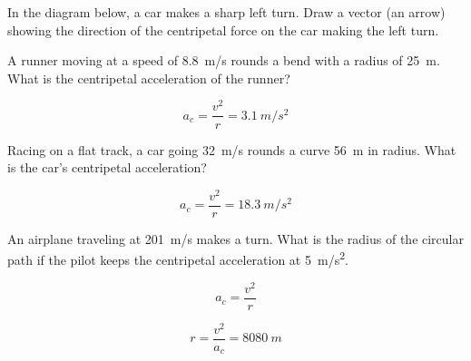 \documentclass[../main-physics-problems.tex]{subfiles}
\begin{document}
\begin{questions}

\question
In the diagram below, a car makes a sharp left turn. Draw a vector (an arrow) showing the direction of the centripetal force on the car making the left turn.

\begin{center}
\end{center}

\question 
A runner moving at a speed of \SI{8.8}{m/s} rounds a bend with a radius of \SI{25}{m}. What is the centripetal acceleration of the runner?

\begin{solution}
\begin{equation*}
    a_c = \frac{v^2}{r} = \SI{3.1}{m/s^2}
\end{equation*}
\end{solution}

\question
Racing on a flat track, a car going \SI{32}{m/s} rounds a curve \SI{56}{m} in radius. What is the car's centripetal acceleration?

\begin{solution}
\begin{equation*}
    a_c = \frac{v^2}{r} = \SI{18.3}{m/s^2}
\end{equation*}
\end{solution}

\question
An airplane traveling at \SI{201}{m/s} makes a turn. What is the radius of the circular path if the pilot keeps the centripetal acceleration at \SI{5}{m/s^2}.

\begin{solution}
\begin{equation*}
    a_c = \frac{v^2}{r}
\end{equation*}

\begin{equation*}
    r = \frac{v^2}{a_c} = \SI{8080}{m}
\end{equation*}
\end{solution}


\end{questions}
\end{document}
